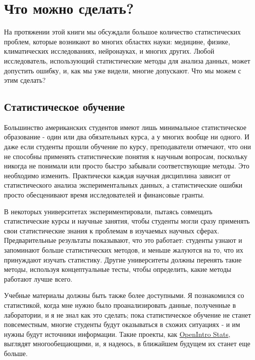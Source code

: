 \chapter{Что можно сделать?}
\label{chp12}

На протяжении этой книги мы обсуждали большое количество статистических проблем, которые возникают во многих областях науки: медицине, физике, климатических исследованиях, нейронауках, и многих других. Любой исследователь, использующий статистические методы для анализа данных, может допустить ошибку, и, как мы уже видели, многие допускают. Что мы можем с этим сделать?


\section{Статистическое обучение}
\label{chp12:statisticaleducation}

Большинство американских студентов имеют лишь минимальное статистическое образование - один или два обязательных курса, а у многих вообще ни одного. И даже если студенты прошли обучение по курсу, преподаватели отмечают, что они не способны применять статистические понятия к научным вопросам, поскольку никогда не понимали или просто быстро забывали соответствующие методы. Это необходимо изменить. Практически каждая научная дисциплина зависит от статистического анализа экспериментальных данных, а статистические ошибки просто обесценивают время исследователей и финансовые гранты. 

В некоторых университетах экспериментировали, пытаясь совмещать статистические курсы и научные занятия, чтобы студенты могли сразу применять свои статистические знания к проблемам в изучаемых научных сферах. Предварительные результаты показывают, что это работает: студенты узнают и запоминают больше статистических методов, и меньше жалуются на то, что их принуждают изучать статистику.\cite{metz_teaching_2008} Другие университеты должны перенять такие методы, используя концептуальные тесты, чтобы определить, какие методы работают лучше всего.  

Учебные материалы должны быть также более доступными. Я познакомился со статистикой, когда мне нужно было проанализировать данные, полученные в лаборатории, и я не знал как это сделать; пока статистическое обучение не станет повсеместным, многие студенты будут оказываться в схожих ситуациях - и им нужны будут источники информации. Такие проекты, как \href{https://www.openintro.org/stat/textbook.php}{OpenIntro Stats}, выглядят многообещающими, и, я надеюсь, в ближайшем будущем их станет еще больше.


